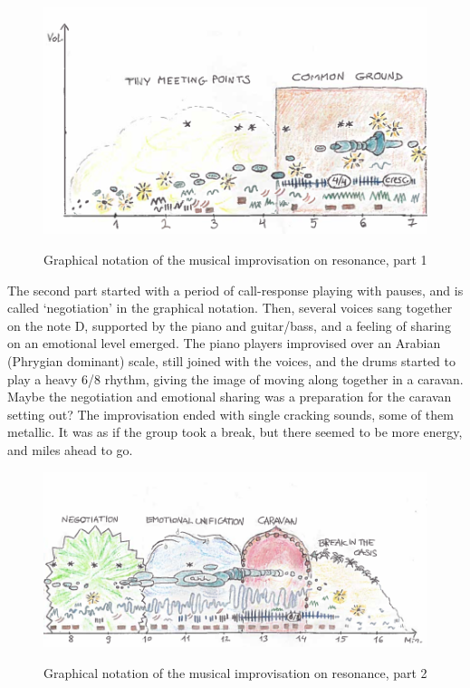 \FloatBarrier
\noindent
\begin{figure}[htb]
\centering %
\caption{Graphical notation of the musical improvisation on resonance, part 1} %
\includegraphics[width=0.9\linewidth]{paper2/p2_data/p2-fig2.png}
\label{fig:p2:2}
\end{figure}
\FloatBarrier
    \begin{adjmulticols}{2}{0mm}{0mm}
The second part started with a period of call-response playing with pauses, and is called ‘negotiation’ in the graphical notation. Then, several voices sang together on the note D, supported by the piano and guitar/bass, and a feeling of sharing on an emotional level emerged. The piano players improvised over an Arabian (Phrygian dominant) scale, still joined with the voices, and the drums started to play a heavy 6/8 rhythm, giving the image of moving along together in a caravan. Maybe the negotiation and emotional sharing was a preparation for the caravan setting out? The improvisation ended with single cracking sounds, some of them metallic. It was as if the group took a break, but there seemed to be more energy, and miles ahead to go.
    \end{adjmulticols}
\FloatBarrier
\noindent
\begin{figure}[htb]
\centering %
\caption{Graphical notation of the musical improvisation on resonance, part 2} %
\includegraphics[width=0.9\linewidth]{paper2/p2_data/p2-fig3.png}
\label{fig:p2:3}
\end{figure}
